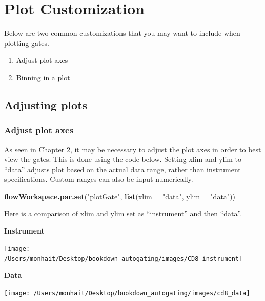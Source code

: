 \documentclass[]{book}
\newenvironment{Shaded}{\begin{snugshade}}{\end{snugshade}}
\newcommand{\DataTypeTok}[1]{\textcolor[rgb]{0.13,0.29,0.53}{#1}}
\newcommand{\KeywordTok}[1]{\textcolor[rgb]{0.13,0.29,0.53}{\textbf{#1}}}
\newcommand{\NormalTok}[1]{#1}
\newcommand{\StringTok}[1]{\textcolor[rgb]{0.31,0.60,0.02}{#1}}
\providecommand{\tightlist}{%
  \setlength{\itemsep}{0pt}\setlength{\parskip}{0pt}}
\begin{document}
\hypertarget{plot-customization}{%
\chapter{Plot Customization}\label{plot-customization}}

Below are two common customizations that you may want to include when plotting gates.

\begin{enumerate}
\def\labelenumi{\arabic{enumi}.}
\tightlist
\item
  Adjust plot axes\\
\item
  Binning in a plot
\end{enumerate}

\hypertarget{adjusting-plots}{%
\section{Adjusting plots}\label{adjusting-plots}}

\hypertarget{adjust-plot-axes}{%
\subsection{Adjust plot axes}\label{adjust-plot-axes}}

As seen in Chapter 2, it may be necessary to adjust the plot axes in order to best view the gates. This is done using the code below. Setting xlim and ylim to ``data'' adjusts plot based on the actual data range, rather than instrument specifications. Custom ranges can also be input numerically.

\begin{Shaded}
\begin{Highlighting}[]
\KeywordTok{flowWorkspace.par.set}\NormalTok{(}\StringTok{"plotGate"}\NormalTok{, }\KeywordTok{list}\NormalTok{(}\DataTypeTok{xlim =} \StringTok{"data"}\NormalTok{,}
                                       \DataTypeTok{ylim =} \StringTok{"data"}\NormalTok{))}
\end{Highlighting}
\end{Shaded}

Here is a comparison of xlim and ylim set as ``instrument'' and then ``data''.

\textbf{Instrument}

\texttt{[image: /Users/monhait/Desktop/bookdown\_autogating/images/CD8\_instrument]}

\textbf{Data}

\texttt{[image: /Users/monhait/Desktop/bookdown\_autogating/images/cd8\_data]}
\end{document}
